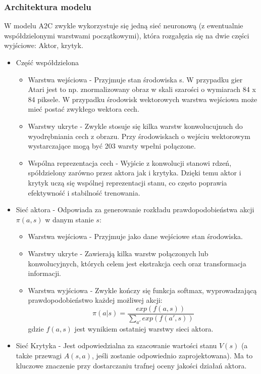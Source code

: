 \documentclass[a4paper, 12pt]{article}
\numberwithin{equation}{section}
\begin{document}
    \subsubsection{Architektura modelu}
    W modelu A2C zwykle wykorzystuje się jedną sieć neuronową (z ewentualnie współdzielonymi warstwami początkowymi), która rozgałęzia się na dwie części wyjściowe: Aktor, krytyk.
    \begin{itemize}
        \item Część współdzielona
        \begin{itemize}
            \item Warstwa wejściowa - Przyjmuje stan środowiska s. W przypadku gier Atari jest to np. znormalizowany obraz w skali szarości o wymiarach 84 x 84 piksele. W przypadku środowisk wektorowych warstwa wejściowa może mieć postać zwykłego wektora cech.
            \item Warstwy ukryte - Zwykle stosuje się kilka warstw konwolucujnuch do wyodrębniania cech z obrazu. Przy środowiskach o wejściu wektorowym wystarczające mogą być 203 warsty wpełni połączone.
            \item Wspólna reprezentacja cech - Wyjście z konwolucji stanowi rdzeń, spółdzielony zarówno przez aktora jak i krytyka. Dzięki temu aktor i krytyk uczą się wspólnej reprezentacji stanu, co często poprawia efektywność i stabilność trenowania.
        \end{itemize}
        \item Sieć aktora - Odpowiada za generowanie rozkładu prawdopodobieństwa akcji \( \pi(a,s) \) w danym stanie \( s \):
        \begin{itemize}
            \item Warstwa wejściowa - Przyjmuje jako dane wejściowe stan środowiska.
            \item Warstwy ukryte - Zawierają kilka warstw połączonych lub konwolucyjnych, których celem jest ekstrakcja cech oraz transformacja informacji.
            \item Warstwa wyjściowa - Zwykle kończy się funkcja softmax, wyprowadzającą prawdopodobieństwo każdej możliwej akcji:
            \begin{equation}
            \pi(a|s) = \frac{exp(f(a,s))}{\sum_{a'}exp(f(a',s))}
            \end{equation}
            gdzie \( f(a,s) \) jest wynikiem ostatniej warstwy sieci aktora.
        \end{itemize}
        \item Sieć Krytyka - Jest odpowiedzialna za szacowanie wartości stanu \( V(s) \) (a także przewagi \( A(s,a) \), jeśli zostanie odpowiednio zaprojektowana). Ma to kluczowe znaczenie przy dostarczaniu trafnej oceny jakości działań aktora.

\end{itemize}
\end{document}
